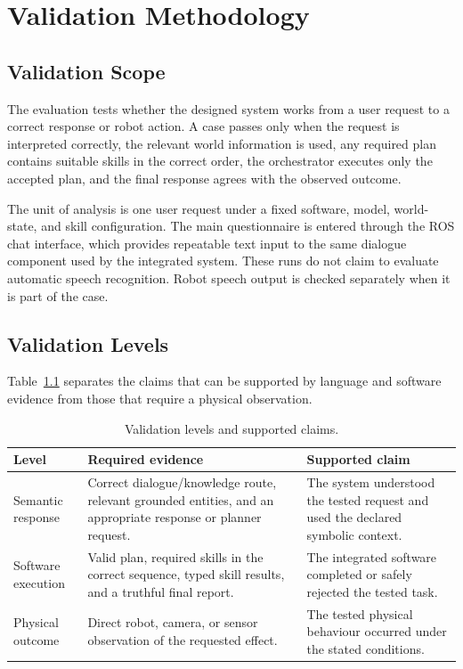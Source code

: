 \chapter{Validation Methodology}
\label{chap:validation-methodology}

\section{Validation Scope}

The evaluation tests whether the designed system works from a user request to a correct response or robot action. A case passes only when the request is interpreted correctly, the relevant world information is used, any required plan contains suitable skills in the correct order, the orchestrator executes only the accepted plan, and the final response agrees with the observed outcome.

The unit of analysis is one user request under a fixed software, model, world-state, and skill configuration. The main questionnaire is entered through the ROS  chat interface, which provides repeatable text input to the same dialogue component used by the integrated system. These runs do not claim to evaluate automatic speech recognition. Robot speech output is checked separately when it is part of the case.

\section{Validation Levels}

Table~\ref{tab:validation-depth} separates the claims that can be supported by language and software evidence from those that require a physical observation.

\begin{table}[H]
\centering
\small
\renewcommand{\arraystretch}{1.14}
\caption{Validation levels and supported claims.}
\label{tab:validation-depth}
\begin{tabularx}{\textwidth}{@{}p{}p{}X@{}}
\toprule
\textbf{Level} & \textbf{Required evidence} & \textbf{Supported claim}\\
\midrule
Semantic response & Correct dialogue/knowledge route, relevant grounded entities, and an appropriate response or planner request. & The system understood the tested request and used the declared symbolic context.\\
Software execution & Valid plan, required skills in the correct sequence, typed skill results, and a truthful final report. & The integrated software completed or safely rejected the tested task.\\
Physical outcome & Direct robot, camera, or sensor observation of the requested effect. & The tested physical behaviour occurred under the stated conditions.\\
\bottomrule
\end{tabularx}
\end{table}


